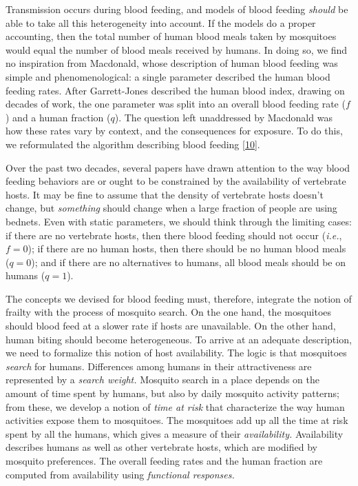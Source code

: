 \documentclass[
]{book}
\begin{document}
Transmission occurs during blood feeding, and models of blood feeding \emph{should} be able to take all this heterogeneity into account. If the models do a proper accounting, then the total number of human blood meals taken by mosquitoes would equal the number of blood meals received by humans. In doing so, we find no inspiration from Macdonald, whose description of human blood feeding was simple and phenomenological: a single parameter described the human blood feeding rates. After Garrett-Jones described the human blood index, drawing on decades of work, the one parameter was split into an overall blood feeding rate (\(f\)) and a human fraction (\(q\)). The question left unaddressed by Macdonald was how these rates vary by context, and the consequences for exposure. To do this, we reformulated the algorithm describing blood feeding {[}\protect\hyperlink{ref-WuSL2022SpatialDynamics}{10}{]}.

Over the past two decades, several papers have drawn attention to the way blood feeding behaviors are or ought to be constrained by the availability of vertebrate hosts. It may be fine to assume that the density of vertebrate hosts doesn't change, but \emph{something} should change when a large fraction of people are using bednets. Even with static parameters, we should think through the limiting cases: if there are no vertebrate hosts, then there blood feeding should not occur (\emph{i.e.}, \(f=0\)); if there are no human hosts, then there should be no human blood meals (\(q=0\)); and if there are no alternatives to humans, all blood meals should be on humans (\(q=1\)).

The concepts we devised for blood feeding must, therefore, integrate the notion of frailty with the process of mosquito search. On the one hand, the mosquitoes should blood feed at a slower rate if hosts are unavailable. On the other hand, human biting should become heterogeneous. To arrive at an adequate description, we need to formalize this notion of host availability.
The logic is that mosquitoes \emph{search} for humans. Differences among humans in their attractiveness are represented by a \emph{search weight.} Mosquito search in a place depends on the amount of time spent by humans, but also by daily mosquito activity patterns; from these, we develop a notion of \emph{time at risk} that characterize the way human activities expose them to mosquitoes. The mosquitoes add up all the time at risk spent by all the humans, which gives a measure of their \emph{availability.} Availability describes humans as well as other vertebrate hosts, which are modified by mosquito preferences. The overall feeding rates and the human fraction are computed from availability using \emph{functional responses.}
\end{document}
